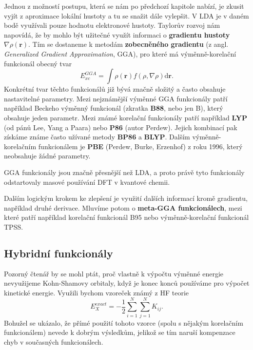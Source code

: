 Jednou z možností postupu, která se nám po předchozí kapitole nabízí, je zkusit vyjít z aproximace lokální hustoty a tu se snažit dále vylepšit. V LDA je v daném bodě využívali pouze hodnotu elektronové hustoty. Taylorův rozvoj nám napovídá, že by mohlo být užitečné využít informaci o \textbf{gradientu hustoty} $\nabla\rho(\textbf{r})$. 
Tím se dostaneme k metodám \textbf{zobecněného gradientu} (z angl. \textit{Generalized Gradient Approximation}, GGA), pro které má výměnně-korelační funkcionál obecný tvar
\begin{equation}
E_{xc}^{GGA}=\int \rho(\textbf{r})f(\rho,\nabla\rho) \mathrm{d}\textbf{r} .
\end{equation}
Konkrétní tvar těchto funkcionálů již bývá značně složitý a často obsahuje nastavitelné parametry. Mezi nejznámější výměnné GGA funkcionály patří například Beckeho výměnný funkcionál (zkratka \textbf{B88}, nebo jen B), který obsahuje jeden parametr. Mezi známé korelační funkcionály patří například \textbf{LYP} (od pánů Lee, Yang a Paara) nebo \textbf{P86} (autor Perdew). Jejich kombinací pak získáme známe často užívané metody \textbf{BP86} a \textbf{BLYP}. Dalším výměnně-korelačním funkcionálem je \textbf{PBE} (Perdew, Burke, Erzenhof) z roku 1996, který neobsahuje žádné parametry.

GGA funkcionály jsou značně přesnější než LDA, a proto právě tyto funkcionály odstartovaly masové používání DFT v kvantové chemii.

Dalším logickým krokem ke zlepšení je využití dalších informací kromě gradientu, například druhé derivace. Mluvíme potom o \textbf{meta-GGA funkcionálech}, mezi které patří například korelační funkcionál B95 nebo výměnně-korelační funkcionál TPSS.

\subsection{Hybridní funkcionály}
Pozorný čtenář by se mohl ptát, proč vlastně k výpočtu výměnné energie nevyužijeme Kohn-Shamovy orbitaly, když je konec konců používáme pro výpočet kinetické energie. Využili bychom vzoreček známý z HF teorie 
\begin{equation}
E_X^{exact}=-\frac{1}{2}\sum_{i=1}^N\sum_{j=1}^N K_{ij} . 
\label{rov:dft:exHF}
\end{equation}
Bohužel se ukázalo, že přímé použití tohoto vzorce (spolu s nějakým korelačním funkcionálem) nevede k dobrým výsledkům, jelikož se tím naruší kompenzace chyb v současných funkcionálech.

